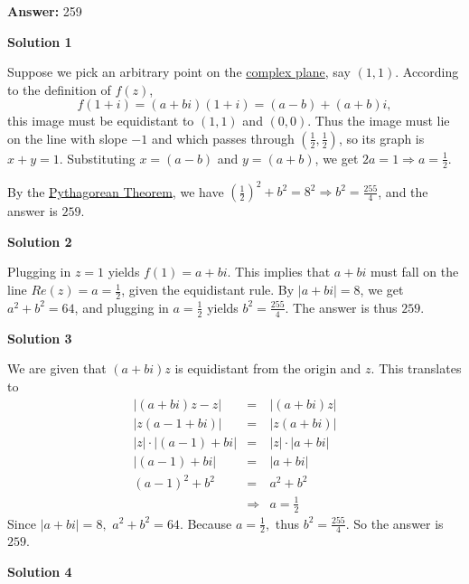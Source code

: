 \begin{enumerate}
 \textbf{Answer: }259



\textbf{Solution 1}

Suppose we pick an arbitrary point on the \href{https://artofproblemsolving.com/wiki/index.php?title=Complex\_plane}{complex plane}, say $(1,1)$. According to the definition of $f(z)$,  
 \[f(1+i) = (a+bi)(1+i) = (a-b) + (a+b)i,\] this image must be equidistant to $(1,1)$ and $(0,0)$. Thus the image must lie on the line with slope $-1$ and which passes through $\left(\frac 12, \frac12\right)$, so its graph is $x + y = 1$. Substituting $x = (a-b)$ and $y = (a+b)$, we get $2a = 1 \Rightarrow a = \frac 12$. 

 By the \href{https://artofproblemsolving.com/wiki/index.php?title=Pythagorean\_Theorem}{Pythagorean Theorem}, we have $\left(\frac{1}{2}\right)^2 + b^2 = 8^2 \Longrightarrow b^2 = \frac{255}{4}$, and the answer is $\boxed{259}$.

 



\textbf{Solution 2}

Plugging in $z=1$ yields $f(1) = a+bi$. This implies that $a+bi$ must fall on the line $Re(z)=a=\frac{1}{2}$, given the equidistant rule. By $|a+bi|=8$, we get $a^2 + b^2 = 64$, and plugging in $a=\frac{1}{2}$ yields $b^2=\frac{255}{4}$. The answer is thus $\boxed{259}$.

 



\textbf{Solution 3}

We are given that $(a + bi)z$ is equidistant from the origin and $z.$  This translates to
 \begin{eqnarray*} |(a + bi)z - z| & = & |(a + bi)z| \\ |z(a - 1 + bi)| & = & |z(a + bi)| \\ |z|\cdot|(a - 1) + bi| & = & |z|\cdot|a + bi| \\ |(a - 1) + bi| & = & |a + bi| \\ (a - 1)^2 + b^2 & = & a^2 + b^2 \\ & \Rightarrow & a = \frac 12 \end{eqnarray*}Since $|a + bi| = 8,$ $a^2 + b^2 = 64.$ Because $a = \frac 12,$ thus $b^2 = \frac {255}4.$  So the answer is $\boxed{259}$.

 



\textbf{Solution 4}


\end{enumerate}
